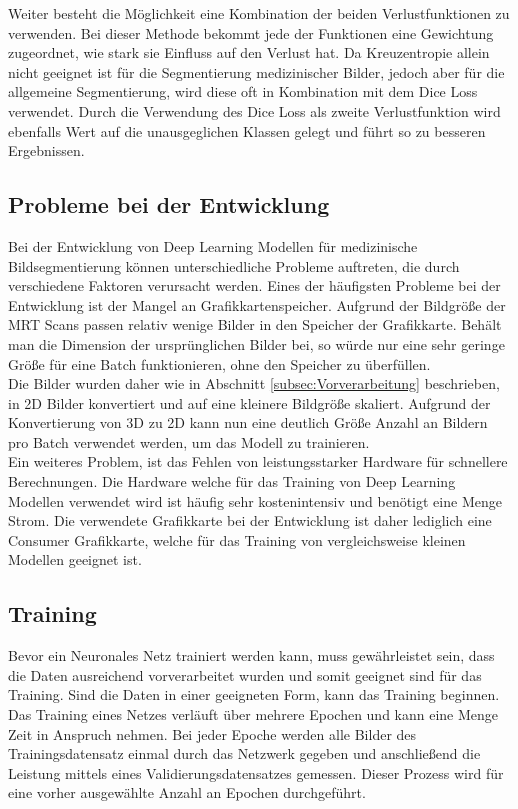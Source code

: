 Weiter besteht die Möglichkeit eine Kombination der beiden Verlustfunktionen zu verwenden. Bei dieser Methode bekommt jede der Funktionen eine Gewichtung zugeordnet, wie stark sie Einfluss auf den Verlust hat. Da Kreuzentropie allein nicht geeignet ist für die Segmentierung medizinischer Bilder, jedoch aber für die allgemeine Segmentierung, wird diese oft in Kombination mit dem Dice Loss verwendet. Durch die Verwendung des Dice Loss als zweite Verlustfunktion wird ebenfalls Wert auf die unausgeglichen Klassen gelegt und führt so zu besseren Ergebnissen. \cite[vgl.][]{Jadon2020}

\subsection{Probleme bei der Entwicklung}
Bei der Entwicklung von Deep Learning \gls{Modell}en für medizinische Bildsegmentierung können unterschiedliche Probleme auftreten, die durch verschiedene Faktoren verursacht werden. Eines der häufigsten Probleme bei der Entwicklung ist der Mangel an Grafikkartenspeicher. Aufgrund der  Bildgröße der \ac{MRT} Scans passen relativ wenige Bilder in den Speicher der Grafikkarte. Behält man die Dimension der ursprünglichen Bilder bei, so würde nur eine sehr geringe Größe für eine Batch funktionieren, ohne den Speicher zu überfüllen. \\
Die Bilder wurden daher wie in Abschnitt \ref{subsec:Vorverarbeitung} beschrieben, in 2D Bilder konvertiert und auf eine kleinere Bildgröße skaliert. Aufgrund der Konvertierung von 3D zu 2D kann nun eine deutlich Größe Anzahl an Bildern pro Batch verwendet werden, um das \gls{Modell} zu trainieren.\\
Ein weiteres Problem, ist das Fehlen von leistungsstarker Hardware für schnellere Berechnungen. Die Hardware welche für das Training von Deep Learning \gls{Modell}en verwendet wird ist häufig sehr kostenintensiv und benötigt eine Menge Strom. Die verwendete Grafikkarte bei der Entwicklung ist daher lediglich eine Consumer Grafikkarte, welche für das Training von vergleichsweise kleinen \gls{Modell}en geeignet ist.

\subsection{Training}
Bevor ein Neuronales Netz trainiert werden kann, muss gewährleistet sein, dass die Daten ausreichend vorverarbeitet wurden und somit geeignet sind für das Training. Sind die Daten in einer geeigneten Form, kann das Training beginnen. Das Training eines Netzes verläuft über mehrere Epochen und kann eine Menge Zeit in Anspruch nehmen. Bei jeder Epoche werden alle Bilder des Trainingsdatensatz einmal durch das Netzwerk gegeben und anschließend die Leistung mittels eines Validierungsdatensatzes gemessen. Dieser Prozess wird für eine vorher ausgewählte Anzahl an Epochen durchgeführt.

